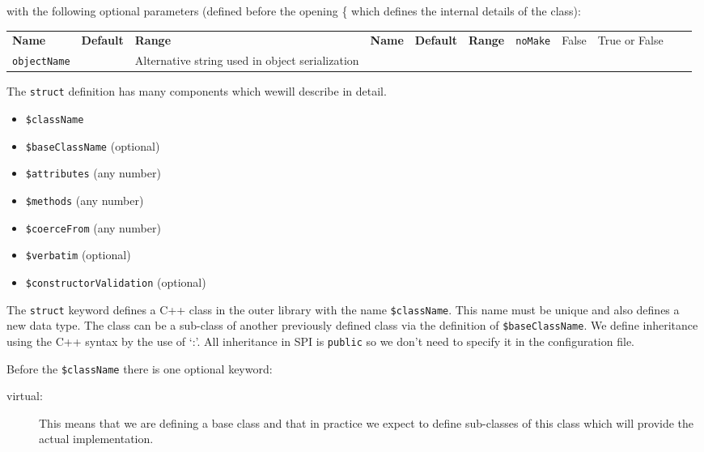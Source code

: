 with the following optional parameters (defined before the opening \{ which defines the internal details of the class):

\small

\begin{longtable}{|p{80pt}|p{150pt}|p{140pt}|l}

 \textbf{Name} & \textbf{Default} & \textbf{Range} & 
\endfirsthead

 \textbf{Name} & \textbf{Default} & \textbf{Range} & 
\endhead

 
\endfoot

\endlastfoot

 \texttt{noMake} & False & True or False \\ 

 \texttt{objectName} &  & Alternative string used in object serialization \\ 

\end{longtable}
\normalsize

The \texttt{struct} definition has many components which wewill describe in detail.
\begin{itemize}
\item \texttt{\$className}
\item \texttt{\$baseClassName} (optional)
\item \texttt{\$attributes} (any number)
\item \texttt{\$methods} (any number)
\item \texttt{\$coerceFrom} (any number)
\item \texttt{\$verbatim} (optional)
\item \texttt{\$constructorValidation} (optional)
\end{itemize}

The \texttt{struct} keyword defines a C++ class in the outer library with the name \texttt{\$className}.
This name must be unique and also defines a new data type.
The class can be a sub-class of another previously defined class via the definition of \texttt{\$baseClassName}.
We define inheritance using the C++ syntax by the use of `:'.
All inheritance in SPI is \texttt{public} so we don't need to specify it in the configuration file.

Before the \texttt{\$className} there is one optional keyword:
\begin{description}
\item[virtual:] This means that we are defining a base class and that in practice we expect to define sub-classes of this class which will provide the actual implementation.
\end{description}


